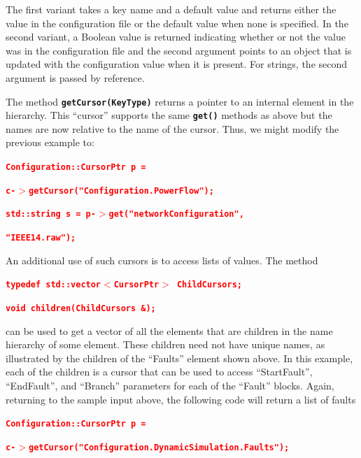 \documentclass[12pt]{report} %
\begin{document}
The first variant takes a key name and a default value and returns either the value in the configuration file or the default value when none is specified. In the second variant, a Boolean value is returned indicating whether or not the value was in the configuration file and the second argument points to an object that is updated with the configuration value when it is present.  For strings, the second argument is passed by reference.  

The method \texttt{\textbf{getCursor(KeyType)}} returns a pointer to an internal element in the hierarchy. This ``cursor'' supports the same \texttt{\textbf{get()}} methods as above but the names are now relative to the name of the  cursor. Thus, we might modify the previous example to:

\textcolor{red}{\texttt{\textbf{Configuration::CursorPtr p = }}}

\textcolor{red}{\texttt{\textbf{c-$\boldsymbol{\mathrm{>}}$getCursor("Configuration.PowerFlow");}}}

\textcolor{red}{\texttt{\textbf{}}}

\textcolor{red}{\texttt{\textbf{std::string s = p-$\boldsymbol{\mathrm{>}}$get("networkConfiguration", }}}

\textcolor{red}{\texttt{\textbf{"IEEE14.raw");}}}

An additional use of such cursors is to access lists of values. The method 

\textcolor{red}{\texttt{\textbf{typedef std::vector$\boldsymbol{\mathrm{<}}$CursorPtr$\boldsymbol{\mathrm{>}}$ ChildCursors;}}}

\textcolor{red}{\texttt{\textbf{}}}

\textcolor{red}{\texttt{\textbf{void children(ChildCursors \&);}}}

can be used to get a vector of all the elements that are children in the name hierarchy of some element. These children need not have unique names, as illustrated by the children of the ``Faults'' element shown above. In this example, each of the children is a cursor that can be used to access ``StartFault'', ``EndFault'', and ``Branch'' parameters for each of the ``Fault'' blocks. Again, returning to the sample input above, the following code will return a list of faults

\textcolor{red}{\texttt{\textbf{Configuration::CursorPtr p = }}}

\textcolor{red}{\texttt{\textbf{c-$\boldsymbol{\mathrm{>}}$getCursor("Configuration.DynamicSimulation.Faults");}}}
\end{document}
